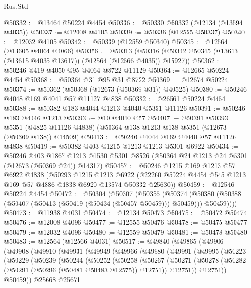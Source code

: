 \begin{lexlean}{RustStd}
\begin{coremodule}
@50332 := @13464 @50224 @4454
@50336 := @50330 @50332 (@12134 (@13594 @4035))
@50337 := @12008 @4105
@50339 := @50336 (@12555 @50337)
@50340 := @12032 @4105
@50342 := @50339 (@12559 @50340)
@50345 := @12564 (@13605 @4064 @4066)
@50356 := @50313
    (@50316 (@50342 @50345 (@13613 (@13615 @4035 @13617)) (@12564 (@12566 @4035)) @15927))
@50362 := @50246 @419 @4050 @95 @4064 @8722 @11129
@50364 := @12665 @50224 @4454
@50368 := @50364 @31 @95 @31 @8722
@50369 := @12674 @50224
@50374 := @50362 (@50368 (@12673 (@50369 @31)) @40525)
@50380 := @50246 @4048 @169 @4041 @57 @11127 @4838
@50382 := @26561 @50224 @4454
@50388 := @50382 @183 @4044 @1213 @4040 @5351 @11126
@50391 := @50246 @183 @4046 @1213
@50393 := @10 @4040 @57
@50407 := @50391
    @50393
    @5351
    (@4825 @11126 @4838)
    (@50364 @138 @1213 @138 @5351 (@12673 (@50369 @138)) @14509)
@50413 := @50246 @4044 @169 @4040 @57 @11126 @4838
@50419 := @50382 @403 @1215 @1213 @1213 @5301 @6922
@50434 := @50246
    @403
    @1867
    @1213
    @1530
    @5301
    @8526
    (@50364 @24 @1213 @24 @5301 (@12673 (@50369 @24)) @14317)
@50457 := @50246
    @1215
    @169
    @1213
    @57
    @6922
    @4838
    (@50293
      @1215
      @1213
      @6922
      (@22260 @50224 @4454 @545 @1213 @169 @57 @4886 @4838 @6920 @13574 @50332 @25630))
@50459 := @12546 @50224 @4454
@50472 := @50304
    (@50307
      (@50356
        (@50374
          (@50380 (@50388 (@50407 (@50413 (@50419 (@50434 (@50457 @50459))) @50459))) @50459))))
@50473 := @11938 @4031
@50474 := @12134 @50473
@50475 := @50472 @50474
@50476 := @12008 @4096
@50477 := @12555 @50476
@50478 := @50475 @50477
@50479 := @12032 @4096
@50480 := @12559 @50479
@50481 := @50478 @50480
@50483 := @12564 (@12566 @4031)
@50517 := @49840
    (@49865
      (@49906
        (@49908
          (@49910
            (@49931
              (@49949
                (@49966
                  (@49980
                    (@49991
                      (@49995
                        (@50223
                          (@50229
                            (@50239
                              (@50244
                                (@50252
                                  (@50258
                                    (@50267
                                      (@50271
                                        (@50278
                                          (@50282 (@50291 (@50296 (@50481 @50483 @12575)) @12751))
                                          @12751))
                                      @12751))
                                  @50459))
                              @25668
                              @25671

\end{coremodule}
\end{lexlean}
